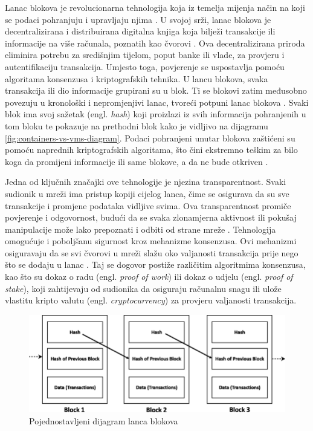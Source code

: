 \documentclass[times, utf8, diplomski]{fer}
\begin{document}
Lanac blokova je revolucionarna tehnologija koja iz temelja mijenja način na koji se podaci pohranjuju i upravljaju njima \cite{antonopoulos2014mastering}. U svojoj srži, lanac blokova je decentralizirana i distribuirana digitalna knjiga koja bilježi transakcije ili informacije na više računala, poznatih kao čvorovi \cite{antonopoulos2018mastering}. Ova decentralizirana priroda eliminira potrebu za središnjim tijelom, poput banke ili vlade, za provjeru i autentifikaciju transakcija. Umjesto toga, povjerenje se uspostavlja pomoću algoritama konsenzusa i kriptografskih tehnika. U lancu blokova, svaka transakcija ili dio informacije grupirani su u blok. Ti se blokovi zatim međusobno povezuju u kronološki i nepromjenjivi lanac, tvoreći potpuni lanac blokova \cite{larimer2013transactions}. Svaki blok ima svoj sažetak (engl. \emph{hash}) koji proizlazi iz svih informacija pohranjenih u tom bloku te pokazuje na prethodni blok kako je vidljivo na dijagramu \ref{fig:containers-vs-vms-diagram}. Podaci pohranjeni unutar blokova zaštićeni su pomoću naprednih kriptografskih algoritama, što čini ekstremno teškim za bilo koga da promijeni informacije ili same blokove, a da ne bude otkriven \cite{buterin2013proof}.

Jedna od ključnih značajki ove tehnologije je njezina transparentnost. Svaki sudionik u mreži ima pristup kopiji cijelog lanca, čime se osigurava da su sve transakcije i promjene podataka vidljive svima. Ova transparentnost promiče povjerenje i odgovornost, budući da se svaka zlonamjerna aktivnost ili pokušaj manipulacije može lako prepoznati i odbiti od strane mreže \cite{buterin2013ethereum}. Tehnologija omogućuje i poboljšanu sigurnost kroz mehanizme konsenzusa. Ovi mehanizmi osiguravaju da se svi čvorovi u mreži slažu oko valjanosti transakcija prije nego što se dodaju u lanac \cite{zohar2015bitcoin}. Taj se dogovor postiže različitim algoritmima konsenzusa, kao što su dokaz o radu (engl. \emph{proof of work}) ili dokaz o udjelu (engl. \emph{proof of stake}), koji zahtijevaju od sudionika da osiguraju računalnu snagu ili ulože vlastitu kripto valutu (engl. \emph{cryptocurrency}) za provjeru valjanosti transakcija.

\begin{figure}[htb]
\centering
\includegraphics[width=\linewidth]{img/Simplified-diagram-of-a-blockchain.png}
\caption{Pojednostavljeni dijagram lanca blokova \cite{articlesimplifieddiagram}}
\label{fig:diagram-of-a-blockchain}
\end{figure}
\end{document}
